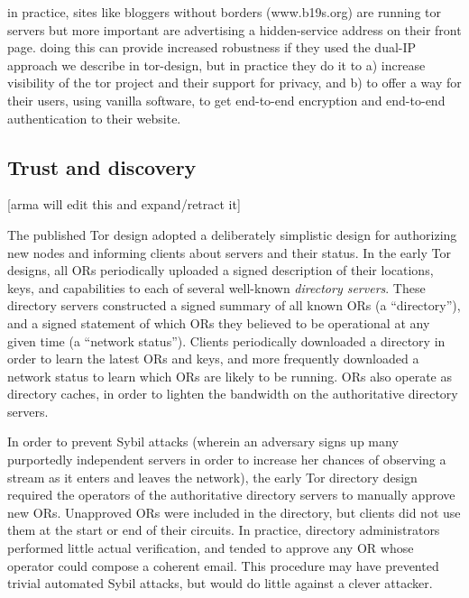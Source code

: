 \documentclass{llncs}
\begin{document}
in practice, sites like bloggers without borders (www.b19s.org) are
running tor servers but more important are advertising a hidden-service
address on their front page. doing this can provide increased robustness
if they used the dual-IP approach we describe in tor-design, but in
practice they do it to a) increase visibility of the tor project and their
support for privacy, and b) to offer a way for their users, using vanilla
software, to get end-to-end encryption and end-to-end authentication to
their website.


\subsection{Trust and discovery}

[arma will edit this and expand/retract it]

The published Tor design adopted a deliberately simplistic design for
authorizing new nodes and informing clients about servers and their status.
In the early Tor designs, all ORs periodically uploaded a signed description
of their locations, keys, and capabilities to each of several well-known {\it
  directory servers}.  These directory servers constructed a signed summary
of all known ORs (a ``directory''), and a signed statement of which ORs they
believed to be operational at any given time (a ``network status'').  Clients
periodically downloaded a directory in order to learn the latest ORs and
keys, and more frequently downloaded a network status to learn which ORs are
likely to be running.  ORs also operate as directory caches, in order to
lighten the bandwidth on the authoritative directory servers.

In order to prevent Sybil attacks (wherein an adversary signs up many
purportedly independent servers in order to increase her chances of observing
a stream as it enters and leaves the network), the early Tor directory design
required the operators of the authoritative directory servers to manually
approve new ORs.  Unapproved ORs were included in the directory, but clients
did not use them at the start or end of their circuits.  In practice,
directory administrators performed little actual verification, and tended to
approve any OR whose operator could compose a coherent email.  This procedure
may have prevented trivial automated Sybil attacks, but would do little
against a clever attacker.
\end{document}
